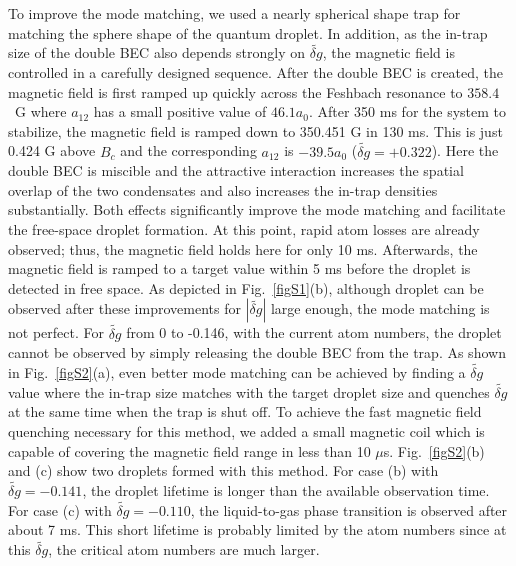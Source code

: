 To improve the mode matching, we used a nearly spherical shape trap for matching the sphere shape of the quantum droplet. In addition, as the in-trap size of the double BEC also depends strongly on $\widetilde{\delta g}$, the magnetic field is controlled in a carefully designed sequence. After the double BEC is created, the magnetic field is first ramped up quickly across the Feshbach resonance to $358.4$~G where $a_{12}$ has a small positive value of $46.1a_0$. After 350 ms for the system to stabilize, the magnetic field is ramped down to 350.451 G in 130 ms. This is just 0.424 G above $B_c$ and the corresponding $a_{12}$ is $-39.5a_0$ ($\widetilde{\delta g} = +0.322$). Here the double BEC is miscible and the attractive interaction increases the spatial overlap of the two condensates and also increases the in-trap densities substantially. Both effects significantly improve the mode matching and facilitate the free-space droplet formation. At this point, rapid atom losses are already observed; thus, the magnetic field holds here for only 10 ms. Afterwards, the magnetic field is ramped to a target value within 5 ms before the droplet is detected in free space. As depicted in Fig.~\ref{figS1}(b), although droplet can be observed after these improvements for $|\widetilde{\delta g}|$ large enough, the mode matching is not perfect. For $\widetilde{\delta g}$ from 0 to -0.146, with the current atom numbers, the droplet cannot be observed by simply releasing the double BEC from the trap. As shown in Fig.~\ref{figS2}(a), even better mode matching can be achieved by finding a $\widetilde{\delta g}$ value where the in-trap size matches with the target droplet size and quenches $\widetilde{\delta g}$ at the same time when the trap is shut off. To achieve the fast magnetic field quenching necessary for this method, we added a small magnetic coil which is capable of covering the magnetic field range in less than 10 $\mu$s. Fig.~\ref{figS2}(b) and (c) show two droplets formed with this method. For case (b) with $\widetilde{\delta g} = -0.141$, the droplet lifetime is longer than the available observation time. For case (c) with $\widetilde{\delta g} = -0.110$, the liquid-to-gas phase transition is observed after about 7 ms. This short lifetime is probably limited by the atom numbers since at this $\widetilde{\delta g}$, the critical atom numbers are much larger.

